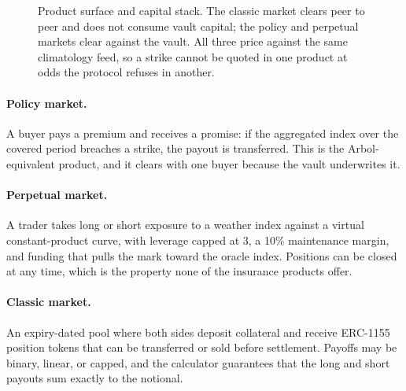 \documentclass[11pt,a4paper]{article}
\begin{document}
\begin{figure}[h]
\caption{Product surface and capital stack. The classic market clears peer to peer and does
not consume vault capital; the policy and perpetual markets clear against the vault. All
three price against the same climatology feed, so a strike cannot be quoted in one product
at odds the protocol refuses in another.}
\end{figure}

\paragraph{Policy market.} A buyer pays a premium and receives a promise: if the aggregated
index over the covered period breaches a strike, the payout is transferred. This is the
Arbol-equivalent product, and it clears with one buyer because the vault underwrites it.

\paragraph{Perpetual market.} A trader takes long or short exposure to a weather index
against a virtual constant-product curve, with leverage capped at 3, a 10\% maintenance
margin, and funding that pulls the mark toward the oracle index. Positions can be closed at
any time, which is the property none of the insurance products offer.

\paragraph{Classic market.} An expiry-dated pool where both sides deposit collateral and
receive ERC-1155 position tokens that can be transferred or sold before settlement. Payoffs
may be binary, linear, or capped, and the calculator guarantees that the long and short
payouts sum exactly to the notional.
\end{document}
